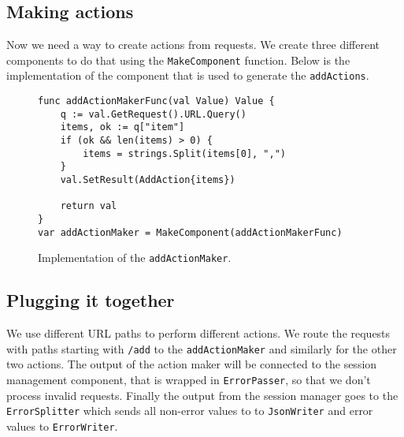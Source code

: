 \subsection{Making actions}
Now we need a way to create actions from requests. We create three different
components to do that using the \texttt{MakeComponent} function. Below
is the implementation of the component that is used to generate 
the \texttt{addActions}.
\begin{figure}[h]
\begin{lstlisting}
func addActionMakerFunc(val Value) Value {
    q := val.GetRequest().URL.Query()
    items, ok := q["item"]
    if (ok && len(items) > 0) {
        items = strings.Split(items[0], ",")
    }
    val.SetResult(AddAction{items})
    
    return val
}
var addActionMaker = MakeComponent(addActionMakerFunc) 
\end{lstlisting}
\caption[scale=1.0]{Implementation of the \texttt{addActionMaker}.}
\label{fig:addActionMaker}
\end{figure}

\subsection{Plugging it together}
We use different URL paths to perform different actions. We route the 
requests with paths starting with \texttt{/add} to the \texttt{addActionMaker}
and similarly for the other two actions. The output of the action maker
will be connected to the session management component, that is wrapped in
\texttt{ErrorPasser}, so that we don't process invalid requests.
Finally the output from the session manager goes to the \texttt{ErrorSplitter}
which sends all non-error values to to \texttt{JsonWriter} and error
values to \texttt{ErrorWriter}. 

